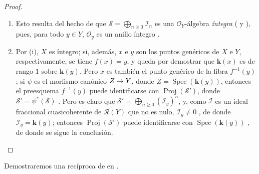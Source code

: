 \documentclass[oneside,10pt]{amsart}
\makeatletter
\renewcommand{\geq}{\geqslant}
\newcommand{\ega@arrow}[2]{\mathchoice{#1}{#2}{#2}{#2}}
\renewcommand{\to}{\ega@arrow{\longrightarrow}{\rightarrow}}
\makeatother
\begin{document}
\begin{proof}
\medskip\noindent
\begin{enumerate}
    \item[\rm{(i)}] Esto resulta del hecho de que $\mathcal{S}=\bigoplus_{n\geq0}\mathcal{I}_n$ es una $\mathcal{O}_Y$-álgebra \emph{íntegra} ( y ), pues, para todo $y\in Y$, $\mathcal{O}_y$ es un anillo íntegro .
    \item[\rm{(ii)}] Por (i), $X$ es íntegro; si, además, $x$ e $y$ son los puntos genéricos de $X$ e $Y$, respectivamente, se tiene $f(x)=y$, y queda por demostrar que $\boldsymbol{k}(x)$ es de rango $1$ sobre $\boldsymbol{k}(y)$.
        Pero $x$ es también el punto genérico de la fibra $f^{-1}(y)$; si $\psi$ es el morfismo canónico $Z\to Y$, donde $Z=\operatorname{Spec}(\boldsymbol{k}(y))$, entonces el preesquema $f^{-1}(y)$ puede identificarse con $\operatorname{Proj}(\mathcal{S}')$, donde $\mathcal{S}'=\psi^*(\mathcal{S})$ .
        Pero es claro que $\mathcal{S}'=\bigoplus_{n\geq0}(\mathcal{I}_y)^n$, y, como $\mathcal{I}$ es un ideal fraccional cuasicoherente de $\mathcal{R}(Y)$ que no es nulo, $\mathcal{I}_y\neq0$ , de donde $\mathcal{I}_y=\boldsymbol{k}(y)$;
        entonces $\operatorname{Proj}(\mathcal{S}')$ puede identificarse con $\operatorname{Spec}(\boldsymbol{k}(y))$ , de donde se sigue la conclusión.
\end{enumerate}
\end{proof}

Demostraremos una recíproca de  en .
\end{document}
